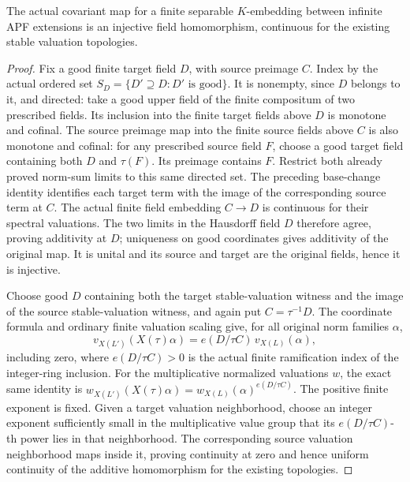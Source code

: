 \begin{lemma}
\label{fw:finite-norm-field-embedding}
\leanok
The actual covariant map for a finite separable $K$-embedding between
infinite APF extensions is an injective field homomorphism, continuous
for the existing stable valuation topologies.
\end{lemma}
\begin{proof}
Fix a good finite target field $D$, with source preimage $C$.
Index by the actual ordered set
$S_D=\{D'\supseteq D:D'\text{ is good}\}$.
It is nonempty, since $D$ belongs to it, and directed: take a good
upper field of the finite compositum of two prescribed fields.
Its inclusion into the finite target fields above $D$ is monotone
and cofinal. The source preimage map into the finite source fields
above $C$ is also monotone and cofinal: for any prescribed source
field $F$, choose a good target field containing both $D$ and
$\tau(F)$. Its preimage contains $F$.
Restrict both already proved norm-sum limits to this same directed
set. The preceding base-change identity identifies each target term
with the image of the corresponding source term at $C$.
The actual finite field embedding $C\to D$ is continuous for their
spectral valuations. The two limits in the Hausdorff field $D$
therefore agree, proving additivity at $D$; uniqueness on good
coordinates gives additivity of the original map.
It is unital and its source and target are the original fields, hence
it is injective.

Choose good $D$ containing both the target stable-valuation witness and
the image of the source stable-valuation witness, and again put
$C=\tau^{-1}D$. The coordinate formula and ordinary finite valuation
scaling give, for all original norm families $\alpha$,
\[
 v_{X(L')}(X(\tau)\alpha)=e(D/\tau C)\,v_{X(L)}(\alpha),
\]
including zero, where $e(D/\tau C)>0$ is the actual finite
ramification index of the integer-ring inclusion.
For the multiplicative normalized valuations $w$, the exact same
identity is
$w_{X(L')}(X(\tau)\alpha)=w_{X(L)}(\alpha)^{e(D/\tau C)}$.
The positive finite exponent is fixed. Given a target valuation
neighborhood, choose an integer exponent sufficiently small in the
multiplicative value group that its $e(D/\tau C)$-th power lies in
that neighborhood. The corresponding source valuation neighborhood
maps inside it, proving continuity at zero and hence uniform
continuity of the additive homomorphism for the existing topologies.
\end{proof}

